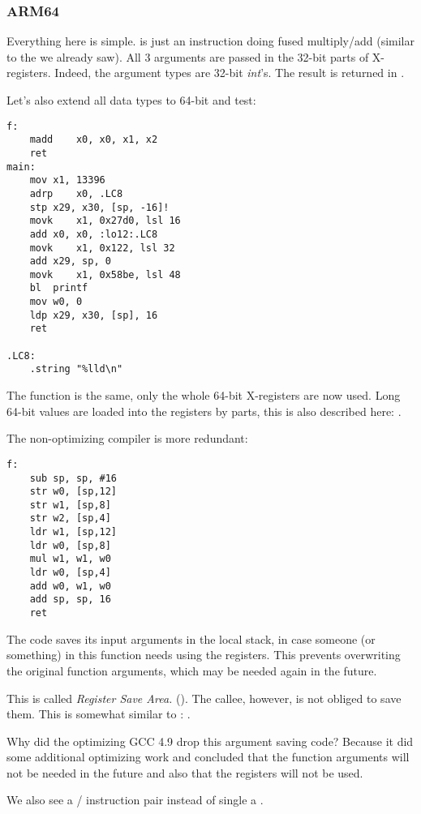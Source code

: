 \subsubsection{ARM64}


Everything here is simple.
 is just an instruction doing fused multiply/add (similar to the  we already saw).
All 3 arguments are passed in the 32-bit parts of X-registers.
Indeed, the argument types are 32-bit \emph{int}'s.
The result is returned in .



Let's also extend all data types to 64-bit  and test:



\begin{lstlisting}[style=customasmARM]
f:
	madd	x0, x0, x1, x2
	ret
main:
	mov	x1, 13396
	adrp	x0, .LC8
	stp	x29, x30, [sp, -16]!
	movk	x1, 0x27d0, lsl 16
	add	x0, x0, :lo12:.LC8
	movk	x1, 0x122, lsl 32
	add	x29, sp, 0
	movk	x1, 0x58be, lsl 48
	bl	printf
	mov	w0, 0
	ldp	x29, x30, [sp], 16
	ret

.LC8:
	.string	"%lld\n"
\end{lstlisting}

The \ttf{} function is the same, only the whole 64-bit X-registers are now used.
Long 64-bit values are loaded into the registers by parts, this is also described here: .


The non-optimizing compiler is more redundant:

\begin{lstlisting}[style=customasmARM]
f:
	sub	sp, sp, #16
	str	w0, [sp,12]
	str	w1, [sp,8]
	str	w2, [sp,4]
	ldr	w1, [sp,12]
	ldr	w0, [sp,8]
	mul	w1, w1, w0
	ldr	w0, [sp,4]
	add	w0, w1, w0
	add	sp, sp, 16
	ret
\end{lstlisting}

The code saves its input arguments in the local stack, 
in case someone (or something) in this function needs using the  
registers. This prevents overwriting the original
function arguments, which may be needed again in the future.

This is called \emph{Register Save Area.} (\ARMPCS).
The callee, however, is not obliged to save them.
This is somewhat similar to : .

Why did the optimizing GCC 4.9 drop this argument saving code?
Because it did some additional optimizing work and concluded
that the function arguments will not be needed in the future 
and also that the registers  will not be used.


We also see a / instruction pair instead of single a .
